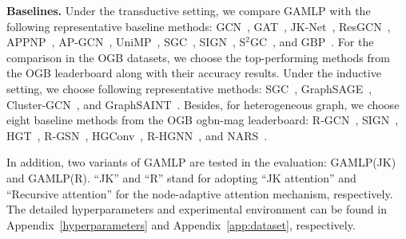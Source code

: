 \documentclass[sigconf]{acmart}
\begin{document}
\noindent\textbf{Baselines.} 
Under the transductive setting, we compare GAMLP with the following representative baseline methods: GCN~\citep{kipf2016semi}, GAT~\citep{velivckovic2017graph}, JK-Net~\citep{xu2018representation}, ResGCN~\citep{li2019deepgcns}, APPNP~\citep{DBLP:conf/iclr/KlicperaBG19}, AP-GCN~\citep{spinelli2020adaptive}, UniMP~\citep{shi2020masked}, SGC~\citep{wu2019simplifying}, SIGN~\citep{frasca2020sign}, S$^2$GC~\citep{zhu2021simple}, and GBP~\citep{DBLP:conf/nips/ChenWDL00W20}.
For the comparison in the OGB datasets, we choose the top-performing methods from the OGB leaderboard along with their accuracy results.
Under the inductive setting, we choose following representative methods: SGC~\citep{wu2019simplifying}, GraphSAGE~\citep{hamilton2017inductive}, Cluster-GCN~\citep{chiang2019cluster}, and GraphSAINT~\citep{DBLP:conf/iclr/ZengZSKP20}. 
Besides, for heterogeneous graph, we choose eight baseline methods from the OGB ogbn-mag leaderboard: R-GCN~\citep{schlichtkrull2018modeling}, SIGN~\citep{frasca2020sign}, HGT~\citep{hu2020heterogeneous}, R-GSN~\citep{wu2021r}, HGConv~\citep{yu2020hybrid}, R-HGNN~\citep{yu2021heterogeneous}, and NARS~\citep{yu2020scalable}. 

In addition, two variants of GAMLP are tested in the evaluation: GAMLP(JK) and GAMLP(R).
``JK'' and ``R'' stand for adopting ``JK attention'' and ``Recursive attention'' for the node-adaptive attention mechanism, respectively.
The detailed hyperparameters and experimental environment can be found in Appendix~\ref{hyperparameters} and Appendix~\ref{app:dataset}, respectively. 
\end{document}
